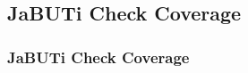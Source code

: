 \subsection{JaBUTi Check Coverage}
\label{example:jabuti-check-coverage}

\begin{frame}[imacidie]
\frametitle{JaBUTi Check Coverage}

\end{frame}